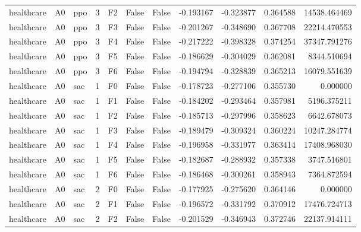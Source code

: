 \begin{tabular}{lllrlllrrrr}
healthcare &      A0 &       ppo &     3 &  F2 &           False &            False & -0.193167 & -0.323877 & 0.364588 &     14538.464469 \\
healthcare &      A0 &       ppo &     3 &  F3 &           False &            False & -0.201267 & -0.348690 & 0.367708 &     22214.470553 \\
healthcare &      A0 &       ppo &     3 &  F4 &           False &            False & -0.217222 & -0.398328 & 0.374254 &     37347.791276 \\
healthcare &      A0 &       ppo &     3 &  F5 &           False &            False & -0.186629 & -0.304029 & 0.362081 &      8344.510694 \\
healthcare &      A0 &       ppo &     3 &  F6 &           False &            False & -0.194794 & -0.328839 & 0.365213 &     16079.551639 \\
healthcare &      A0 &       sac &     1 &  F0 &           False &            False & -0.178723 & -0.277106 & 0.355730 &         0.000000 \\
healthcare &      A0 &       sac &     1 &  F1 &           False &            False & -0.184202 & -0.293464 & 0.357981 &      5196.375211 \\
healthcare &      A0 &       sac &     1 &  F2 &           False &            False & -0.185713 & -0.297996 & 0.358623 &      6642.678073 \\
healthcare &      A0 &       sac &     1 &  F3 &           False &            False & -0.189479 & -0.309324 & 0.360224 &     10247.284774 \\
healthcare &      A0 &       sac &     1 &  F4 &           False &            False & -0.196958 & -0.331977 & 0.363414 &     17408.968030 \\
healthcare &      A0 &       sac &     1 &  F5 &           False &            False & -0.182687 & -0.288932 & 0.357338 &      3747.516801 \\
healthcare &      A0 &       sac &     1 &  F6 &           False &            False & -0.186468 & -0.300261 & 0.358943 &      7364.872594 \\
healthcare &      A0 &       sac &     2 &  F0 &           False &            False & -0.177925 & -0.275620 & 0.364146 &         0.000000 \\
healthcare &      A0 &       sac &     2 &  F1 &           False &            False & -0.196572 & -0.331792 & 0.370912 &     17476.724713 \\
healthcare &      A0 &       sac &     2 &  F2 &           False &            False & -0.201529 & -0.346943 & 0.372746 &     22137.914111 \\

\end{tabular}
